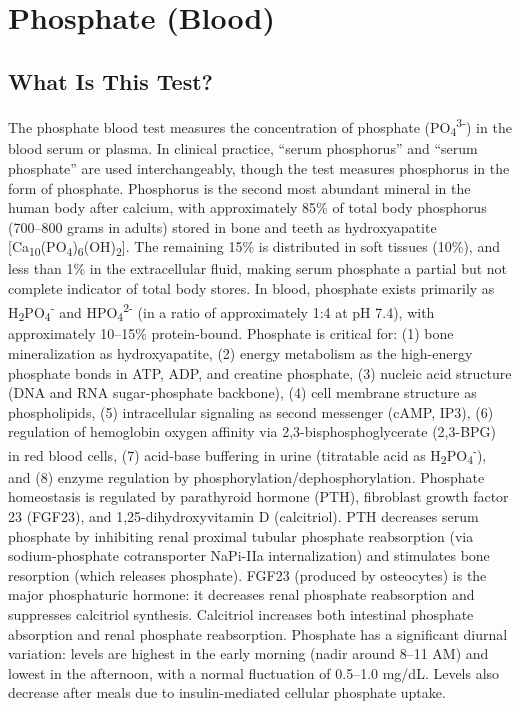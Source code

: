 \chapter{Phosphate (Blood)}

\section*{What Is This Test?}
The phosphate blood test measures the concentration of phosphate (PO\textsubscript{4}\textsuperscript{3-}) in the blood serum or plasma. In clinical practice, ``serum phosphorus'' and ``serum phosphate'' are used interchangeably, though the test measures phosphorus in the form of phosphate. Phosphorus is the second most abundant mineral in the human body after calcium, with approximately 85\% of total body phosphorus (700--800 grams in adults) stored in bone and teeth as hydroxyapatite [Ca\textsubscript{10}(PO\textsubscript{4})\textsubscript{6}(OH)\textsubscript{2}]. The remaining 15\% is distributed in soft tissues (10\%), and less than 1\% in the extracellular fluid, making serum phosphate a partial but not complete indicator of total body stores. In blood, phosphate exists primarily as H\textsubscript{2}PO\textsubscript{4}\textsuperscript{-} and HPO\textsubscript{4}\textsuperscript{2-} (in a ratio of approximately 1:4 at pH 7.4), with approximately 10--15\% protein-bound. Phosphate is critical for: (1) bone mineralization as hydroxyapatite, (2) energy metabolism as the high-energy phosphate bonds in ATP, ADP, and creatine phosphate, (3) nucleic acid structure (DNA and RNA sugar-phosphate backbone), (4) cell membrane structure as phospholipids, (5) intracellular signaling as second messenger (cAMP, IP3), (6) regulation of hemoglobin oxygen affinity via 2,3-bisphosphoglycerate (2,3-BPG) in red blood cells, (7) acid-base buffering in urine (titratable acid as H\textsubscript{2}PO\textsubscript{4}\textsuperscript{-}), and (8) enzyme regulation by phosphorylation/dephosphorylation. Phosphate homeostasis is regulated by parathyroid hormone (PTH), fibroblast growth factor 23 (FGF23), and 1,25-dihydroxyvitamin D (calcitriol). PTH decreases serum phosphate by inhibiting renal proximal tubular phosphate reabsorption (via sodium-phosphate cotransporter NaPi-IIa internalization) and stimulates bone resorption (which releases phosphate). FGF23 (produced by osteocytes) is the major phosphaturic hormone: it decreases renal phosphate reabsorption and suppresses calcitriol synthesis. Calcitriol increases both intestinal phosphate absorption and renal phosphate reabsorption. Phosphate has a significant diurnal variation: levels are highest in the early morning (nadir around 8--11 AM) and lowest in the afternoon, with a normal fluctuation of 0.5--1.0 mg/dL. Levels also decrease after meals due to insulin-mediated cellular phosphate uptake.

